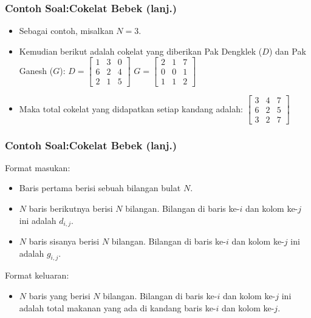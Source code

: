 \begin{frame}
\frametitle{Contoh Soal:\newline Cokelat Bebek (lanj.)}
\begin{itemize}
  \item Sebagai contoh, misalkan $N = 3$.
  \item Kemudian berikut adalah cokelat yang diberikan Pak Dengklek ($D$) dan Pak Ganesh ($G$):
  \vfill
  \(D =
  \left[\begin{matrix}
  1 & 3 & 0 \\
  6 & 2 & 4 \\
  2 & 1 & 5
  \end{matrix}\right]
  \)
  \hfil
  \(G =
  \left[\begin{matrix}
  2 & 1 & 7 \\
  0 & 0 & 1 \\
  1 & 1 & 2
  \end{matrix}\right]
  \) \centering
  \item Maka total cokelat yang didapatkan setiap kandang adalah:
  \vfill
  \(
  \left[\begin{matrix}
  3 & 4 & 7 \\
  6 & 2 & 5 \\
  3 & 2 & 7
  \end{matrix}\right]
  \) \centering
\end{itemize}
\end{frame}

\begin{frame}
\frametitle{Contoh Soal:\newline Cokelat Bebek (lanj.)}
Format masukan:
\begin{itemize}
  \item Baris pertama berisi sebuah bilangan bulat $N$.
  \item $N$ baris berikutnya berisi $N$ bilangan. Bilangan di baris ke-$i$ dan kolom ke-$j$ ini adalah $d_{i,j}$.
  \item $N$ baris sisanya berisi $N$ bilangan. Bilangan di baris ke-$i$ dan kolom ke-$j$ ini adalah $g_{i,j}$.
\end{itemize}
Format keluaran:
\begin{itemize}
  \item $N$ baris yang berisi $N$ bilangan. Bilangan di baris ke-$i$ dan kolom ke-$j$ ini adalah total makanan yang ada di kandang baris ke-$i$ dan kolom ke-$j$.
\end{itemize}
\end{frame}

